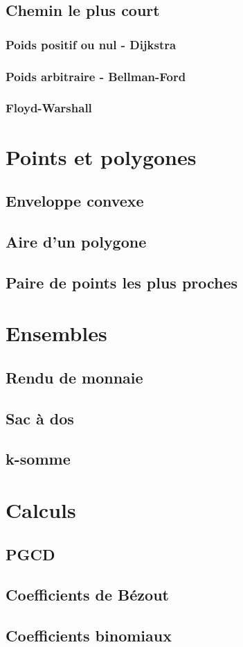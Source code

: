 \documentclass[8pt]{article}
\begin{document}
        \subsection{Chemin le plus court}
            \subsubsection{Poids positif ou nul - Dijkstra}
            \subsubsection{Poids arbitraire - Bellman-Ford}
            \subsubsection{Floyd-Warshall}
    \section{Points et polygones}
        \subsection{Enveloppe convexe}
        \subsection{Aire d'un polygone}
        \subsection{Paire de points les plus proches}
    \section{Ensembles}
        \subsection{Rendu de monnaie}
        \subsection{Sac à dos}
        \subsection{k-somme}
    \section{Calculs}
        \subsection{PGCD}
        {\scriptsize}
        \subsection{Coefficients de Bézout}
        {\scriptsize}
        \subsection{Coefficients binomiaux}
        {\scriptsize}
\end{document}

